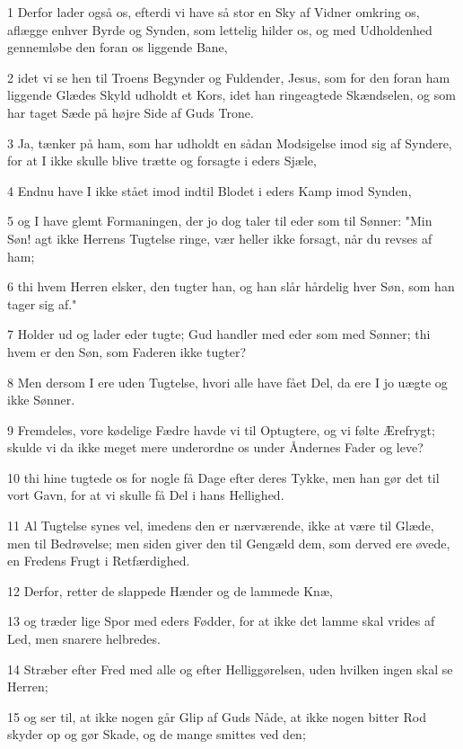 \par 1 Derfor lader også os, efterdi vi have så stor en Sky af Vidner omkring os, aflægge enhver Byrde og Synden, som lettelig hilder os, og med Udholdenhed gennemløbe den foran os liggende Bane,
\par 2 idet vi se hen til Troens Begynder og Fuldender, Jesus, som for den foran ham liggende Glædes Skyld udholdt et Kors, idet han ringeagtede Skændselen, og som har taget Sæde på højre Side af Guds Trone.
\par 3 Ja, tænker på ham, som har udholdt en sådan Modsigelse imod sig af Syndere, for at I ikke skulle blive trætte og forsagte i eders Sjæle,
\par 4 Endnu have I ikke stået imod indtil Blodet i eders Kamp imod Synden,
\par 5 og I have glemt Formaningen, der jo dog taler til eder som til Sønner: "Min Søn! agt ikke Herrens Tugtelse ringe, vær heller ikke forsagt, når du revses af ham;
\par 6 thi hvem Herren elsker, den tugter han, og han slår hårdelig hver Søn, som han tager sig af."
\par 7 Holder ud og lader eder tugte; Gud handler med eder som med Sønner; thi hvem er den Søn, som Faderen ikke tugter?
\par 8 Men dersom I ere uden Tugtelse, hvori alle have fået Del, da ere I jo uægte og ikke Sønner.
\par 9 Fremdeles, vore kødelige Fædre havde vi til Optugtere, og vi følte Ærefrygt; skulde vi da ikke meget mere underordne os under Åndernes Fader og leve?
\par 10 thi hine tugtede os for nogle få Dage efter deres Tykke, men han gør det til vort Gavn, for at vi skulle få Del i hans Hellighed.
\par 11 Al Tugtelse synes vel, imedens den er nærværende, ikke at være til Glæde, men til Bedrøvelse; men siden giver den til Gengæld dem, som derved ere øvede, en Fredens Frugt i Retfærdighed.
\par 12 Derfor, retter de slappede Hænder og de lammede Knæ,
\par 13 og træder lige Spor med eders Fødder, for at ikke det lamme skal vrides af Led, men snarere helbredes.
\par 14 Stræber efter Fred med alle og efter Helliggørelsen, uden hvilken ingen skal se Herren;
\par 15 og ser til, at ikke nogen går Glip af Guds Nåde, at ikke nogen bitter Rod skyder op og gør Skade, og de mange smittes ved den;
